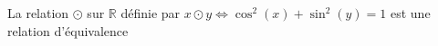 La relation $\odot$ sur $\mathbb R$ définie par $x\odot y \iff \cos^2(x)+\sin^2(y)=1$ est une relation d'équivalence

\begin{reponses}
\end{reponses}

